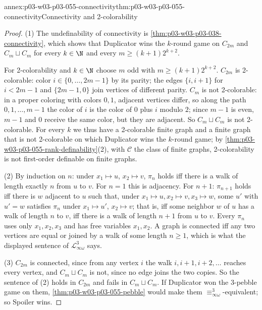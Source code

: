 \begin{annexitem}{annex:p03-w03-p03-055-connectivity}{thm:p03-w03-p03-055-connectivity}{Connectivity and 2-colorability}
\begin{proof}
(1) The undefinability of connectivity is
\cref{thm:p03-w03-p03-038-connectivity}, which shows that Duplicator wins
the \(k\)-round game on \(C_{2m}\) and \(C_m\sqcup C_m\) for every
\(k\in\N\) and every \(m\ge(k+1)2^{k+2}\).

For 2-colorability and \(k\in\N\) choose \(m\) odd with
\(m\ge(k+1)2^{k+2}\).
\(C_{2m}\) is 2-colorable: color \(i\in\{0,\ldots,2m-1\}\) by its parity;
the edges \(\{i,i+1\}\) for \(i<2m-1\) and \(\{2m-1,0\}\) join vertices of
different parity. \(C_m\) is not 2-colorable: in a proper coloring with
colors \(0,1\), adjacent vertices differ, so along the path
\(0,1,\ldots,m-1\) the color of \(i\) is the color of \(0\) plus \(i\)
modulo \(2\); since \(m-1\) is even, \(m-1\) and \(0\) receive the same
color, but they are adjacent. So \(C_m\sqcup C_m\) is not 2-colorable.
For every \(k\) we thus have a 2-colorable finite graph and a finite graph
that is not 2-colorable on which Duplicator wins the \(k\)-round game; by
\cref{thm:p03-w03-p03-055-rank-definability}(2), with \(\mathcal C\) the
class of finite graphs, 2-colorability is not first-order definable on
finite graphs.

(2) By induction on \(n\): under \(x_1\mapsto u\), \(x_2\mapsto v\),
\(\pi_n\) holds iff there is a walk of length exactly \(n\) from \(u\) to
\(v\). For \(n=1\) this is adjacency. For \(n+1\): \(\pi_{n+1}\) holds iff
there is \(w\) adjacent to \(u\) such that, under
\(x_1\mapsto u,x_2\mapsto v,x_3\mapsto w\), some \(u'\) with \(u'=w\)
satisfies \(\pi_n\) under \(x_1\mapsto u'\), \(x_2\mapsto v\); that is, iff
some neighbor \(w\) of \(u\) has a walk of length \(n\) to \(v\), iff
there is a walk of length \(n+1\) from \(u\) to \(v\). Every \(\pi_n\) uses
only \(x_1,x_2,x_3\) and has free variables \(x_1,x_2\). A graph is
connected iff any two vertices are equal or joined by a walk of some length
\(n\ge1\), which is what the displayed sentence of
\(\mathcal L^3_{\infty\omega}\) says.

(3) \(C_{2m}\) is connected, since from any vertex \(i\) the walk
\(i,i+1,i+2,\ldots\) reaches every vertex, and \(C_m\sqcup C_m\) is not,
since no edge joins the two copies. So the sentence of (2) holds in
\(C_{2m}\) and fails in \(C_m\sqcup C_m\).
If Duplicator won the \(3\)-pebble game on them,
\cref{thm:p03-w03-p03-055-pebble} would make them
\(\equiv^3_{\infty\omega}\)-equivalent; so Spoiler wins.
\end{proof}
\end{annexitem}


